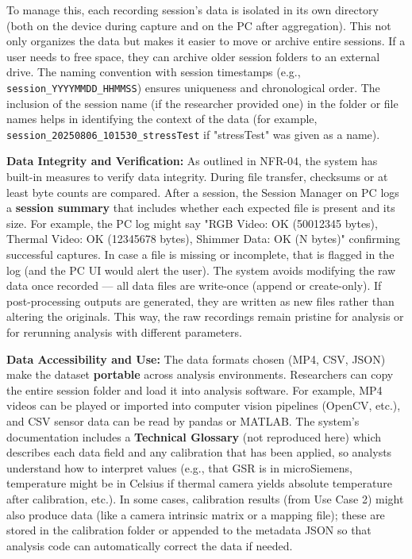 \documentclass[11pt,a4paper]{report}
\begin{document}
To manage this, each recording session's data is isolated in its own
directory (both on the device during capture and on the PC after
aggregation). This not only organizes the data but makes it easier to
move or archive entire sessions. If a user needs to free space, they can
archive older session folders to an external drive. The naming
convention with session timestamps (e.g., \texttt{session\_YYYYMMDD\_HHMMSS})
ensures uniqueness and chronological order. The inclusion of the session
name (if the researcher provided one) in the folder or file names helps
in identifying the context of the data (for example,
\texttt{session\_20250806\_101530\_stressTest} if "stressTest" was given as a
name).

\textbf{Data Integrity and Verification:} As outlined in NFR-04, the system
has built-in measures to verify data integrity. During file transfer,
checksums or at least byte counts are
compared.
After a session, the Session Manager on PC logs a \textbf{session summary}
that includes whether each expected file is present and its
size.
For example, the PC log might say "RGB Video: OK (50012345 bytes),
Thermal Video: OK (12345678 bytes), Shimmer Data: OK (N bytes)" confirming
successful captures. In case a file is missing or incomplete, that is
flagged in the log (and the PC UI would alert the user). The system
avoids modifying the raw data once recorded --- all data files are
write-once (append or create-only). If post-processing outputs are
generated, they are written as new files rather than altering the
originals. This way, the raw recordings remain pristine for analysis or
for rerunning analysis with different parameters.

\textbf{Data Accessibility and Use:} The data formats chosen (MP4, CSV, JSON)
make the dataset \textbf{portable} across analysis environments. Researchers
can copy the entire session folder and load it into analysis software.
For example, MP4 videos can be played or imported into computer vision
pipelines (OpenCV, etc.), and CSV sensor data can be read by pandas or
MATLAB. The system's documentation includes a \textbf{Technical Glossary}
(not reproduced here) which describes each data field and any
calibration that has been applied, so analysts understand how to
interpret values (e.g., that GSR is in microSiemens, temperature might
be in Celsius if thermal camera yields absolute temperature after
calibration, etc.). In some cases, calibration results (from Use Case 2)
might also produce data (like a camera intrinsic matrix or a mapping
file); these are stored in the calibration folder or appended to the
metadata JSON so that analysis code can automatically correct the data
if needed.
\end{document}
